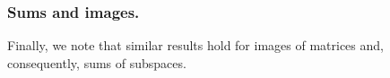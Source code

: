 \documentclass{lms}
\begin{document}
\subsubsection*{Sums and images.}

Finally, we note that similar results hold for images of matrices and,
consequently, sums of subspaces.



\end{document}
